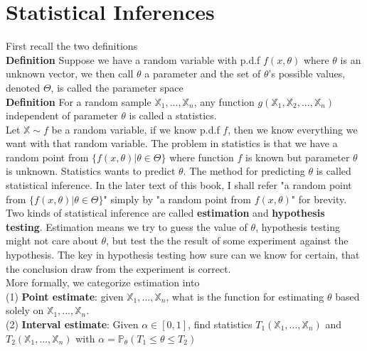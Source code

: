 \section{Statistical Inferences}

First recall the two definitions\\

\textbf{Definition}
Suppose we have a random variable with p.d.f $f(x, \theta)$ where $\theta$ is an unknown vector, we then call $\theta$ a parameter and the set of $\theta$'s possible values, denoted $\Theta$, is called the parameter space\\

\textbf{Definition}
For a random sample $\mathbb{X}_1, ..., \mathbb{X}_n$, any function $g(\mathbb{X}_1, \mathbb{X}_2, ..., \mathbb{X}_n)$ independent of parameter $\theta$ is called a statistics.\\

Let $\mathbb{X} \sim f$ be a random variable, if we know p.d.f $f$, then we know everything we want with that random variable. The problem in statistics is that we have a random point from $\{ f(x, \theta) | \theta\in\Theta \}$ where function $f$ is known but parameter $\theta$ is unknown. Statistics wants to predict $\theta$. The method for predicting $\theta$ is called statistical inference. In the later text of this book, I shall refer "a random point from $\{ f(x, \theta) | \theta\in\Theta \}$" simply by "a random point from $f(x, \theta)$" for brevity.\\

Two kinds of statistical inference are called \textbf{estimation} and \textbf{hypothesis testing}. Estimation means we try to guess the value of $\theta$, hypothesis testing might not care about $\theta$, but test the the result of some experiment against the hypothesis. The key in hypothesis testing how sure can we know for certain, that the conclusion draw from the experiment is correct.\\

More formally, we categorize estimation into\\
(1) \textbf{Point estimate}: given $\mathbb{X}_1, ..., \mathbb{X}_n$, what is the function for estimating $\theta$ based solely on $\mathbb{X}_1, ..., \mathbb{X}_n$.\\
(2) \textbf{Interval estimate}: Given $\alpha\in[0, 1]$, find statistics $T_1(\mathbb{X}_1, ..., \mathbb{X}_n)$ and $T_2(\mathbb{X}_1, ..., \mathbb{X}_n)$ with $\alpha = \mathbb{P}_{\theta}( T_1 \leq \theta \leq T_2 )$\\

